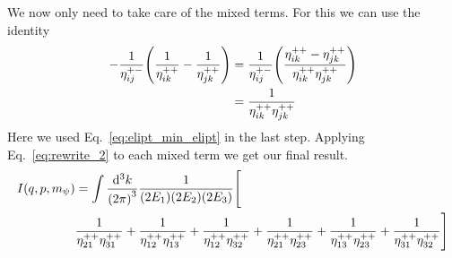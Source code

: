 We now only need to take care of the mixed terms. For this we can use the identity
\begin{align}
    -\frac{1}{\eta_{ij}^{+-}} \qty(\frac{1}{\eta_{ik}^{++}}-\frac{1}{\eta_{jk}^{++}})
&= \frac{1}{\eta_{ij}^{+-}} \qty(\frac{\eta_{ik}^{++}-\eta_{jk}^{++}}{\eta_{ik}^{++}\eta_{jk}^{++}})\\
&= \frac{1}{\eta_{ik}^{++}\eta_{jk}^{++}} \label{eq:rewrite_2}
\end{align}
Here we used Eq.~\eqref{eq:elipt_min_elipt} in the last step.
Applying Eq.~\eqref{eq:rewrite_2} to each mixed term we get our final result.
\begin{align*}
I(q,p,m_\psi)
&=  \int \frac{\dd[3]{k}}{{(2\pi)}^3} \frac{1}{(2E_1)(2E_2)(2E_3)} \Bigg[\\
  &\frac{1}{\eta_{21}^{++}\eta_{31}^{++}}
+ \frac{1}{\eta_{12}^{++}\eta_{13}^{++}}
+ \frac{1}{\eta_{12}^{++}\eta_{32}^{++}}
+ \frac{1}{\eta_{21}^{++}\eta_{23}^{++}}
+ \frac{1}{\eta_{13}^{++}\eta_{23}^{++}}
+ \frac{1}{\eta_{31}^{++}\eta_{32}^{++}}
\Bigg]
\end{align*}